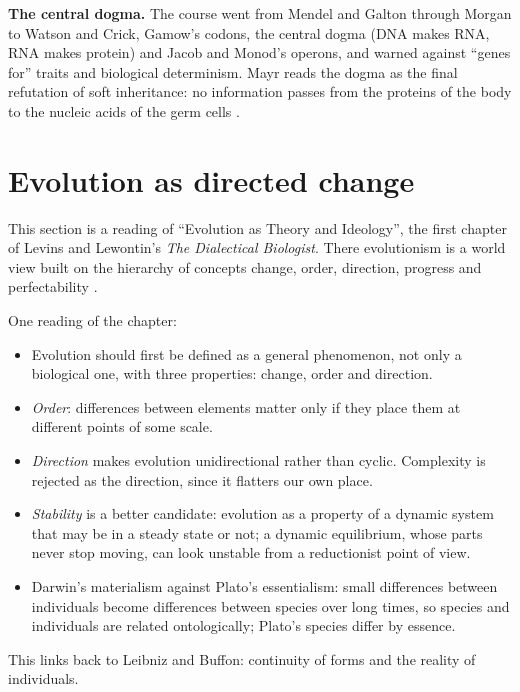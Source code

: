 \textbf{The central dogma.} The course
went from Mendel and Galton through
Morgan to Watson and Crick, Gamow's
codons, the central dogma (DNA makes RNA,
RNA makes protein) and Jacob and Monod's
operons, and warned against ``genes for''
traits and biological determinism. Mayr
reads the dogma as the final refutation of
soft inheritance: no information passes
from the proteins of the body to the
nucleic acids of the germ cells
\cite[Chapter 4]{mayr2002evolution}.

\section{Evolution as directed change}
\label{section-essay}

This section is a reading of ``Evolution
as Theory and Ideology'', the first
chapter of Levins and Lewontin's
\emph{The Dialectical Biologist}. There
evolutionism is a world
view built on the hierarchy of concepts
change, order, direction, progress and
perfectability
\cite[Chapter 1]{levins1985dialectical}.

One reading of the chapter:
\begin{itemize}
\item Evolution should first be defined as
a general phenomenon, not only a
biological one, with three properties:
change, order and direction.
\item \emph{Order}: differences between
elements matter only if they place them at
different points of some scale.
\item \emph{Direction} makes evolution
unidirectional rather than cyclic.
Complexity is rejected as the direction,
since it flatters our own place.
\item \emph{Stability} is a better
candidate: evolution as a property of a
dynamic system that may be in a steady
state or not; a dynamic equilibrium, whose
parts never stop moving, can look unstable
from a reductionist point of view.
\item Darwin's materialism against Plato's
essentialism: small differences between
individuals become differences between
species over long times, so species and
individuals are related ontologically;
Plato's species differ by essence.
\end{itemize}
This links back to Leibniz and Buffon: continuity of forms
and the reality of individuals.





